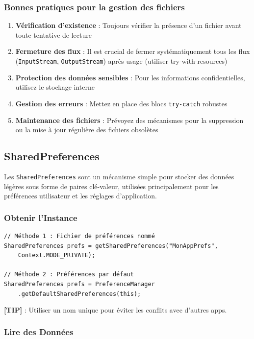\documentclass[11pt,a4paper]{article}
\begin{document}
\subsubsection{Bonnes pratiques pour la gestion des fichiers}

\begin{enumerate}
    \item \textbf{Vérification d'existence} : Toujours vérifier la présence d'un fichier avant toute tentative de lecture
    \item \textbf{Fermeture des flux} : Il est crucial de fermer systématiquement tous les flux (\texttt{InputStream}, \texttt{OutputStream}) après usage (utiliser try-with-resources)
    \item \textbf{Protection des données sensibles} : Pour les informations confidentielles, utilisez le stockage interne
    \item \textbf{Gestion des erreurs} : Mettez en place des blocs \texttt{try-catch} robustes
    \item \textbf{Maintenance des fichiers} : Prévoyez des mécanismes pour la suppression ou la mise à jour régulière des fichiers obsolètes
\end{enumerate}

\subsection{SharedPreferences}

Les \texttt{SharedPreferences} sont un mécanisme simple pour stocker des données légères sous forme de paires clé-valeur, utilisées principalement pour les préférences utilisateur et les réglages d'application.

\subsubsection{Obtenir l'Instance}

\begin{lstlisting}
// Méthode 1 : Fichier de préférences nommé
SharedPreferences prefs = getSharedPreferences("MonAppPrefs", 
    Context.MODE_PRIVATE);

// Méthode 2 : Préférences par défaut
SharedPreferences prefs = PreferenceManager
    .getDefaultSharedPreferences(this);
\end{lstlisting}

\textbf{[TIP]} : Utiliser un nom unique pour éviter les conflits avec d'autres apps.

\subsubsection{Lire des Données}
\end{document}
